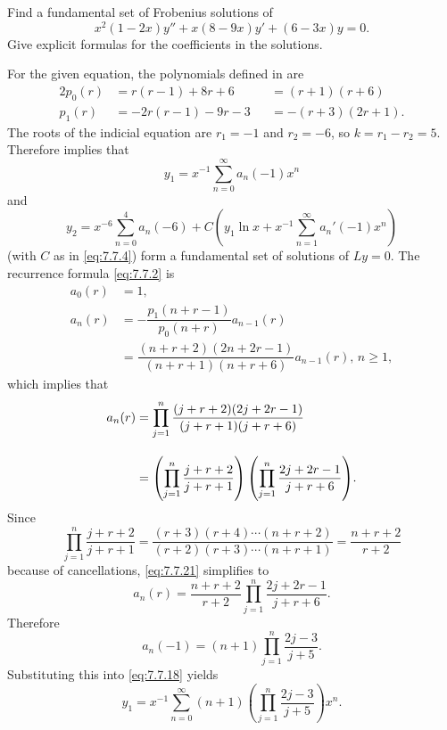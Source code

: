 \begin{example}\label{example:7.7.2}
Find a fundamental set of Frobenius  solutions of
\[
x^2(1-2x)y''+x(8-9x)y'+(6-3x)y=0.
\]
Give explicit  formulas for the coefficients in the solutions.
\end{example}

\begin{solution}
For  the given equation, the polynomials defined in
 are
\begin{alignat*}{2}
p_0(r)&=r(r-1)+8r+6&&=(r+1)(r+6)\\
p_1(r)&=-2r(r-1)-9r-3&&=-(r+3)(2r+1).
\end{alignat*}
The roots of the indicial equation  are $r_1=-1$ and $r_2=-6$,
so $k=r_1-r_2=5$. Therefore  implies that
\begin{equation} \label{eq:7.7.18}
y_1=x^{-1}\sum_{n=0}^\infty a_n(-1)x^n
\end{equation}
and
\begin{equation} \label{eq:7.7.19}
y_2=x^{-6}\sum_{n=0}^4a_n(-6)+C\left(y_1\ln
x+x^{-1}\sum_{n=1}^\infty a_n'(-1)x^n\right)
\end{equation}
(with $C$ as in \eqref{eq:7.7.4})
form a fundamental set of solutions of $Ly=0$. The
recurrence formula \eqref{eq:7.7.2} is
\begin{equation} \label{eq:7.7.20}
\begin{aligned}
a_0(r)&=1,\\
a_n(r)&=-\dfrac{p_1(n+r-1)}{p_0(n+r)}a_{n-1}(r)\\
&=\dfrac{(n+r+2)(2n+2r-1)}{(n+r+1)(n+r+6)}a_{n-1}(r),\,n\ge1,
\end{aligned}
\end{equation}
which implies that
\begin{equation} \label{eq:7.7.21}
\begin{aligned}
a_n(r)&=\displaystyle{\prod_{j=1}^n\frac{(j+r+2)(2j+2r-1)}{(j+r+1)(j+r+6)}}\\[10pt]
&=\displaystyle{\left(\prod_{j=1}^n\frac{j+r+2}{j+r+1}\right)
\left(\prod_{j=1}^n\frac{2j+2r-1}{j+r+6}\right)}.
\end{aligned}
\end{equation}
Since
\[
\prod_{j=1}^n\frac{j+r+2}{j+r+1}=\frac{(r+3)(r+4)\cdots(n+r+2)}{(r+2)(r+3)\cdots(n+r+1)}=\frac{n+r+2}{r+2}
\]
because of cancellations, \eqref{eq:7.7.21}  simplifies to
\[
a_n(r)=\frac{n+r+2}{r+2}\prod_{j=1}^n\frac{2j+2r-1}{j+r+6}.
\]
Therefore
\[
a_n(-1)=(n+1)\prod_{j=1}^n\frac{2j-3}{j+5}.
\]
Substituting this into \eqref{eq:7.7.18} yields
\[
y_1=x^{-1}\sum_{n=0}^\infty (n+1)\left(\prod_{j=1}^n\frac{2j-3}{j+5}\right) x^n.
\]


\end{solution}
